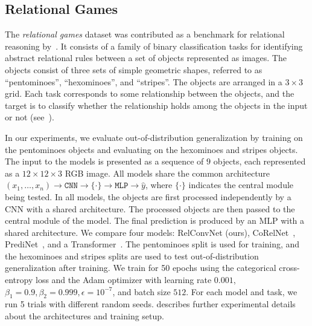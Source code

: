 \subsection{Relational Games}\label{ssec:exp_relational_games}

The \textit{relational games} dataset was contributed as a benchmark for relational reasoning by~\citet{shanahanExplicitlyRelationalNeural}. It consists of a family of binary classification tasks for identifying abstract relational rules between a set of objects represented as images. The objects consist of three sets of simple geometric shapes, referred to as ``pentominoes'', ``hexominoes'', and ``stripes''. The objects are arranged in a $3 \times 3$ grid. Each task corresponds to some relationship between the objects, and the target is to classify whether the relationship holds among the objects in the input or not (see~).

In our experiments, we evaluate out-of-distribution generalization by training on the pentominoes objects and evaluating on the hexominoes and stripes objects. The input to the models is presented as a sequence of $9$ objects, each represented as a $12 \times 12 \times 3$ RGB image. All models share the common architecture $(x_1, \ldots, x_n) \to \texttt{CNN} \to \{ \cdot \} \to \texttt{MLP} \to \hat{y}$, where $\{\cdot\}$ indicates the central module being tested. In all models, the objects are first processed independently by a CNN with a shared architecture. The processed objects are then passed to the central module of the model. The final prediction is produced by an MLP with a shared architecture. We compare four models: RelConvNet (ours), CoRelNet~\citep{kergNeuralArchitecture2022}, PrediNet~\citep{shanahanExplicitlyRelationalNeural}, and a Transformer~\citep{vaswani2017attention}. The pentominoes split is used for training,
and the hexominoes and stripes splits are used to test out-of-distribution generalization after training. 
We train for 50 epochs using the categorical cross-entropy loss and the Adam optimizer with learning rate $0.001$, $\beta_1 = 0.9, \beta_2 = 0.999, \epsilon = 10^{-7}$, and batch size $512$. For each model and task, we run 5 trials with different random seeds.
 describes further experimental details about the architectures and training setup.

